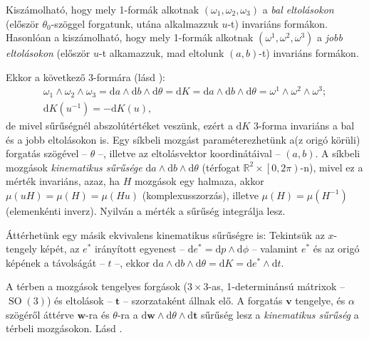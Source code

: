 \documentclass[DIV=15,appendixprefix]{scrreprt}
\theoremstyle{definition}
\theoremstyle{remark}
\DeclareMathOperator{\SO}{SO}
\begin{document}
Kiszámolható, hogy mely 1-formák alkotnak  $ \left( \omega_{ 1 },{} \omega_{ 2 },{}
\omega_{ 3 } \right) $ a \emph{bal eltolásokon} (először
$ \theta_{ 0 } $-szöggel forgatunk, utána alkalmazzuk $ u $-t) invariáns formákon. Hasonlóan a
kiszámolható, hogy mely 1-formák alkotnak  $ \left( \omega^{ 1 },{} \omega^{ 2 },{}
\omega^{ 3 } \right) $ a \emph{jobb eltolásokon} (először
$ u $-t alkamazzuk, mad eltolunk $ \left( a,{} b \right) $-t) invariáns formákon.

Ekkor a következő 3-formára (lásd \cite[6.~fejezet, 3.~szakasz, 85.~oldal]{Santalo}):
\begin{gather*}
	\omega_{ 1 } \wedge \omega_{ 2 } \wedge \omega_{ 3 } = \mathrm{ d } a \wedge \mathrm{ d } b
	\wedge \mathrm{ d } \theta = \mathrm{ d } K = \mathrm{ d } a \wedge \mathrm{ d } b
	\wedge \mathrm{ d } \theta = \omega^{ 1 } \wedge \omega^{ 2 } \wedge \omega^{ 3 };\\
	\mathrm{ d } K \left( u^{ - 1 } \right)  = - \mathrm{ d } K \left( u \right),
\end{gather*}
de mivel sűrűségnél abszolútértéket veszünk, ezért a $ \mathrm{ d } K $ 3-forma invariáns a bal és a
jobb eltolásokon is.
%
Egy síkbeli mozgást paraméterezhetünk a(z origó körüli) forgatás szögével -- $ \theta $ --, illetve
az eltolásvektor
koordinátáival -- $ \left( a,{} b \right)  $. A síkbeli mozgások \emph{kinematikus sűrűsége}
$ \mathrm{ d } a \wedge \mathrm{ d } b \wedge \mathrm{ d } \theta $ (térfogat $ \mathbb{ R }^{ 2 }
\times \left.\left[ 0,{} 2 \pi \right)\right. $-n), mivel ez a mérték invariáns, azaz, ha $ H $
mozgások egy halmaza, akkor $ \mu \left( u H \right) = \mu \left( H \right) = \mu \left( Hu
\right) $ (komplexusszorzás), illetve $ \mu \left( H \right) = \mu \left( H^{ - 1 } \right) $
(elemenkénti inverz). Nyilván a mérték a sűrűség integrálja lesz.

Áttérhetünk egy másik ekvivalens kinematikus sűrűségre is: Tekintsük az $ x $-tengely képét, az
$ e^{ * } $ irányított egyenest -- $ \mathrm{ d } e^{ * } =  \mathrm{ d }p \wedge \mathrm{ d } \phi
$ -- valamint $ e^{ * } $  és az origó képének a távolságát -- $ t $ --, ekkor
$  \mathrm{ d } a \wedge \mathrm{ d } b \wedge \mathrm{ d } \theta =  \mathrm{ d } K =
\mathrm{ d }e^{ * } \wedge \mathrm{ d } t $.

A térben a mozgások tengelyes forgások ($ 3 \times  3 $-as, 1-determinánsú mátrixok -- $ \SO
\left( 3 \right) $) és eltolások -- $ \mathbf{ t } $ -- szorzataként állnak elő. A forgatás
$ \mathbf{ v } $ tengelye, és $ \alpha $ szögéről áttérve $ \mathbf{ w } $-ra és $ \theta $-ra a
$ \mathrm{ d } \mathbf{ w } \wedge \mathrm{ d } \theta \wedge \mathrm{ d } \mathbf{ t } $ sűrűség
lesz a \emph{kinematikus sűrűség} a térbeli mozgásokon.
%
Lásd \cite[6.~fejezet, 4.~szakasz, 89--90.~oldal]{Santalo}.
\end{document}
